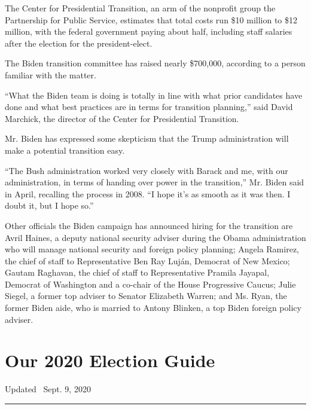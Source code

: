 The Center for Presidential Transition, an arm of the nonprofit group
the Partnership for Public Service, estimates that total costs run \$10
million to \$12 million, with the federal government paying about half,
including staff salaries after the election for the president-elect.

The Biden transition committee has raised nearly \$700,000, according to
a person familiar with the matter.

``What the Biden team is doing is totally in line with what prior
candidates have done and what best practices are in terms for transition
planning,'' said David Marchick, the director of the Center for
Presidential Transition.

Mr. Biden has expressed some skepticism that the Trump administration
will make a potential transition easy.

``The Bush administration worked very closely with Barack and me, with
our administration, in terms of handing over power in the transition,''
Mr. Biden said in April, recalling the process in 2008. ``I hope it's as
smooth as it was then. I doubt it, but I hope so.''

Other officials the Biden campaign has announced hiring for the
transition are Avril Haines, a deputy national security adviser during
the Obama administration who will manage national security and foreign
policy planning; Angela Ramirez, the chief of staff to Representative
Ben Ray Luján, Democrat of New Mexico; Gautam Raghavan, the chief of
staff to Representative Pramila Jayapal, Democrat of Washington and a
co-chair of the House Progressive Caucus; Julie Siegel, a former top
adviser to Senator Elizabeth Warren; and Ms. Ryan, the former Biden
aide, who is married to Antony Blinken, a top Biden foreign policy
adviser.

\hypertarget{our-2020-election-guide}{%
\section{Our 2020 Election Guide}\label{our-2020-election-guide}}

Updated ~Sept. 9, 2020

\begin{center}\rule{0.5\linewidth}{\linethickness}\end{center}


